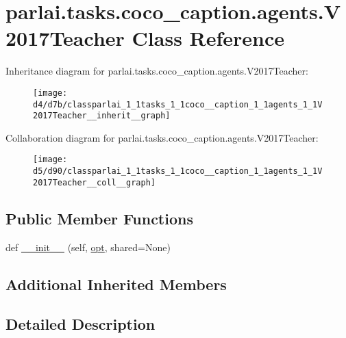 \hypertarget{classparlai_1_1tasks_1_1coco__caption_1_1agents_1_1V2017Teacher}{}\section{parlai.\+tasks.\+coco\+\_\+caption.\+agents.\+V2017\+Teacher Class Reference}
\label{classparlai_1_1tasks_1_1coco__caption_1_1agents_1_1V2017Teacher}


Inheritance diagram for parlai.\+tasks.\+coco\+\_\+caption.\+agents.\+V2017\+Teacher\+:
\nopagebreak
\begin{figure}[H]
\begin{center}
\leavevmode
\texttt{[image: d4/d7b/classparlai\_1\_1tasks\_1\_1coco\_\_caption\_1\_1agents\_1\_1V2017Teacher\_\_inherit\_\_graph]}
\end{center}
\end{figure}


Collaboration diagram for parlai.\+tasks.\+coco\+\_\+caption.\+agents.\+V2017\+Teacher\+:
\nopagebreak
\begin{figure}[H]
\begin{center}
\leavevmode
\texttt{[image: d5/d90/classparlai\_1\_1tasks\_1\_1coco\_\_caption\_1\_1agents\_1\_1V2017Teacher\_\_coll\_\_graph]}
\end{center}
\end{figure}
\subsection*{Public Member Functions}
\begin{DoxyCompactItemize}
\item 
def \hyperlink{classparlai_1_1tasks_1_1coco__caption_1_1agents_1_1V2017Teacher_a9e0aff09f69cd575af3238cab3a1d623}{\+\_\+\+\_\+init\+\_\+\+\_\+} (self, \hyperlink{classparlai_1_1core_1_1agents_1_1Teacher_a3ce6243860ce978a897922863ed32fa4}{opt}, shared=None)
\end{DoxyCompactItemize}
\subsection*{Additional Inherited Members}


\subsection{Detailed Description}


